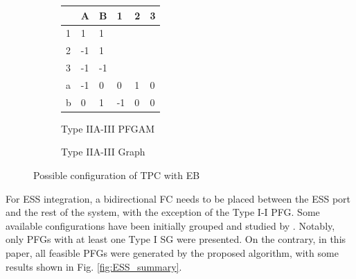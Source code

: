\documentclass[conference]{IEEEtran}
\begin{document}
\begin{figure}[htbp]\centering
        
        \begin{subfigure}{0.45\columnwidth}\centering
        {\footnotesize\begin{tabular}{| m{2pt} || m{7pt} | m{7pt}| m{7pt} | m{7pt} | m{7pt}  ||} 
         \hline
         & A & B & 1 & 2 & 3  \\ [0.5ex] 
         \hline\hline
         1 & 1 & \cellcolor{red!30}1 &  \cellcolor{gray!30} &  \cellcolor{gray!30} &  \cellcolor{gray!30} \\ 
         \hline
         2 & \cellcolor{red!30}-1 & 1 & \cellcolor{gray!30} &  \cellcolor{gray!30} &  \cellcolor{gray!30}\\
         \hline
         3 & -1 & -1 & \cellcolor{gray!30} &  \cellcolor{gray!30} &  \cellcolor{gray!30}\\
         \hline
         a & -1 & 0 & 0 & 1 & 0\\
         \hline
         b & 0 & 1 & -1 & 0 & 0\\
      \hline\hline
        \end{tabular}}\caption{Type IIA-III PFGAM}\end{subfigure}
        \begin{subfigure}{0.45\columnwidth}\centering
         \caption{Type IIA-III Graph}
        \end{subfigure}\hfill
        \caption{Possible configuration of TPC with EB}\label{fig:EB_summary}
\end{figure} 

For ESS integration, a bidirectional FC needs to be placed between the ESS port and the rest of the system, with the exception of the Type I-I PFG. Some available configurations have been initially grouped and studied by \cite{yang_synthesis_2015}. Notably, only PFGs with at least one Type I SG were presented. On the contrary, in this paper, all feasible PFGs were generated by the proposed algorithm, with some results shown in Fig. \ref{fig:ESS_summary}.
\end{document}

